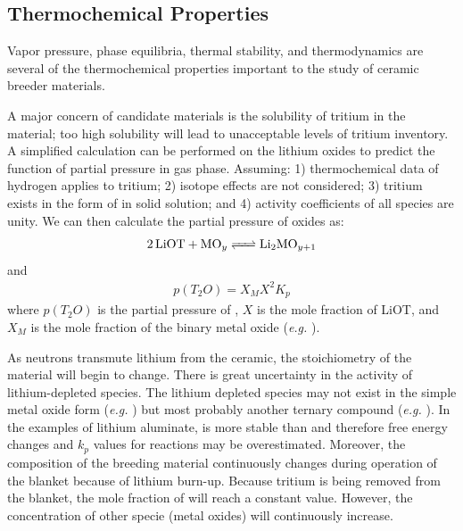 \documentclass[11pt]{report} %
\newcommand{\lisix}{\ce{^6Li}}
\begin{document}



\subsection{Thermochemical Properties}
Vapor pressure, phase equilibria, thermal stability, and thermodynamics are several of the thermochemical properties important to the study of ceramic breeder materials. 

A major concern of candidate materials is the solubility of tritium in the material; too high solubility will lead to unacceptable levels of tritium inventory. A simplified calculation can be performed on the lithium oxides to predict the function of  partial pressure in gas phase. Assuming: 1) thermochemical data of hydrogen applies to tritium; 2) isotope effects are not considered; 3) tritium exists in the form of  in solid solution; and 4) activity coefficients of all species are unity. We can then calculate the partial pressure of oxides as:
\begin{align}\label{eq:liot-equilibrium}
\ce{2LiOT + MO_y <=> Li2MO_{y+1}}
\end{align}
and
\begin{align}
p(T_2O) = X_MX^2K_p
\end{align}
where $p(T_2O)$ is the partial pressure of , $X$ is the mole fraction of LiOT, and $X_M$ is the mole fraction of the binary metal oxide (\textit{e.g.} ). 

As neutrons transmute lithium from the ceramic, the stoichiometry of the material will begin to change. There is great uncertainty in the activity of lithium-depleted species. The lithium depleted species may not exist in the simple metal oxide form (\textit{e.g.} ) but most probably another ternary compound (\textit{e.g.} ). In the examples of lithium aluminate,  is more stable than  and therefore free energy changes and $k_p$ values for reactions may be overestimated. Moreover, the composition of the breeding material continuously changes during operation of the blanket because of lithium burn-up. Because tritium is being removed from the blanket, the mole fraction of  will reach a constant value. However, the concentration of other specie (metal oxides) will continuously increase.
\end{document}
